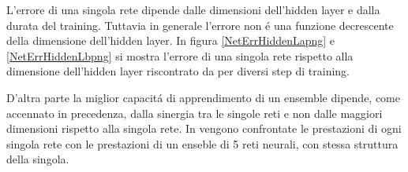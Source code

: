 \documentclass[a4paper,12pt]{report}
\begin{document}
 L'errore di una singola rete dipende dalle dimensioni dell'hidden layer e dalla durata del training. 
 Tuttavia in generale l'errore non \'e una funzione decrescente della dimensione dell'hidden layer. 
 In figura \ref{NetErrHiddenLapng} e \ref{NetErrHiddenLbpng} si mostra l'errore di una singola rete rispetto alla dimensione dell'hidden layer riscontrato da \cite{lincoln1990synergy} per diversi step di training. 
 
 D'altra parte la miglior capacit\'a di apprendimento di un ensemble dipende, come accennato in precedenza, dalla sinergia tra le singole reti e non dalle maggiori dimensioni rispetto alla singola rete. 
 In \cite{lincoln1990synergy} vengono confrontate le prestazioni di ogni singola rete con le prestazioni di un enseble di 5 reti neurali, con stessa struttura della singola.
 
\end{document}
